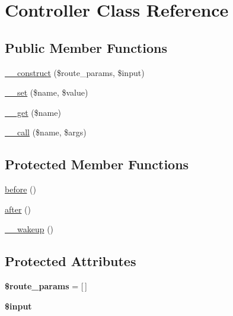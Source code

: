 \hypertarget{class_zest_1_1_controller_1_1_controller}{}\section{Controller Class Reference}
\label{class_zest_1_1_controller_1_1_controller}
\subsection*{Public Member Functions}
\begin{DoxyCompactItemize}
\item 
\mbox{\hyperlink{class_zest_1_1_controller_1_1_controller_ae063ce25d7804a3bc3252f399feb2576}{\+\_\+\+\_\+construct}} (\$route\+\_\+params, \$input)
\item 
\mbox{\hyperlink{class_zest_1_1_controller_1_1_controller_a83c2703c91959192f759992ad5640b67}{\+\_\+\+\_\+set}} (\$name, \$value)
\item 
\mbox{\hyperlink{class_zest_1_1_controller_1_1_controller_abc8e9e31bb15c8a44c3210ec551407c8}{\+\_\+\+\_\+get}} (\$name)
\item 
\mbox{\hyperlink{class_zest_1_1_controller_1_1_controller_af231e86ad32039b9573ae228db5a29fa}{\+\_\+\+\_\+call}} (\$name, \$args)
\end{DoxyCompactItemize}
\subsection*{Protected Member Functions}
\begin{DoxyCompactItemize}
\item 
\mbox{\hyperlink{class_zest_1_1_controller_1_1_controller_acfb47e2bfffbf95c232d7562cfc5b6c1}{before}} ()
\item 
\mbox{\hyperlink{class_zest_1_1_controller_1_1_controller_a1c4f41ef2c0bc555e009e4c937f79f56}{after}} ()
\item 
\mbox{\hyperlink{class_zest_1_1_controller_1_1_controller_a19dd44fe063cfd1cbafe97452e57666c}{\+\_\+\+\_\+wakeup}} ()
\end{DoxyCompactItemize}
\subsection*{Protected Attributes}
\begin{DoxyCompactItemize}
\item 
\mbox{\label{class_zest_1_1_controller_1_1_controller_ab170b7254f65feafb414320c9a8f5cc8}} 
{\bfseries \$route\+\_\+params} = \mbox{[}$\,$\mbox{]}
\item 
\mbox{\label{class_zest_1_1_controller_1_1_controller_a69b271260be394b90709736cccb22c76}} 
{\bfseries \$input}
\end{DoxyCompactItemize}


